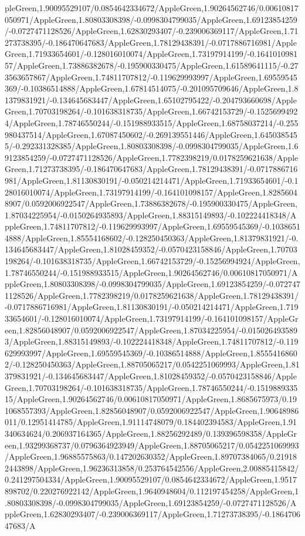 {\begin{tikzternal}
{pleGreen,1.90095529107/0.0854642334672/AppleGreen,1.90264562746/0.00610817050971/AppleGreen,1.80803308398/-0.0998304799035/AppleGreen,1.69123854259/-0.0727471128526/AppleGreen,1.62830293407/-0.239006369117/AppleGreen,1.71273738395/-0.186470647683/AppleGreen,1.78129438391/-0.0717886716981/AppleGreen,1.71933654601/-0.128016010074/AppleGreen,1.73197914199/-0.164101098157/AppleGreen,1.73886382678/-0.195900330475/AppleGreen,1.61589641115/-0.273563657867/AppleGreen,1.74811707812/-0.119629993997/AppleGreen,1.69559545369/-0.10386514888/AppleGreen,1.67814514075/-0.201095709646/AppleGreen,1.81379831921/-0.134645683447/AppleGreen,1.65102795422/-0.204793660698/AppleGreen,1.70703198264/-0.101638318735/AppleGreen,1.66742153729/-0.15256994924/AppleGreen,1.78746550244/-0.151988933515/AppleGreen,1.68758037214/-0.255980437514/AppleGreen,1.67087450602/-0.269139551446/AppleGreen,1.6450385455/-0.292331328385/AppleGreen,1.80803308398/-0.0998304799035/AppleGreen,1.69123854259/-0.0727471128526/AppleGreen,1.7782398219/0.0178259621638/AppleGreen,1.71273738395/-0.186470647683/AppleGreen,1.78129438391/-0.0717886716981/AppleGreen,1.81130830191/-0.050214214471/AppleGreen,1.71933654601/-0.128016010074/AppleGreen,1.73197914199/-0.164101098157/AppleGreen,1.82856048907/0.0592006922547/AppleGreen,1.73886382678/-0.195900330475/AppleGreen,1.87034225954/-0.0150264935893/AppleGreen,1.88315149893/-0.102224418348/AppleGreen,1.74811707812/-0.119629993997/AppleGreen,1.69559545369/-0.10386514888/AppleGreen,1.85554168602/-0.128250450363/AppleGreen,1.81379831921/-0.134645683447/AppleGreen,1.81028459352/-0.0570423158846/AppleGreen,1.70703198264/-0.101638318735/AppleGreen,1.66742153729/-0.15256994924/AppleGreen,1.78746550244/-0.151988933515/AppleGreen,1.90264562746/0.00610817050971/AppleGreen,1.80803308398/-0.0998304799035/AppleGreen,1.69123854259/-0.0727471128526/AppleGreen,1.7782398219/0.0178259621638/AppleGreen,1.78129438391/-0.0717886716981/AppleGreen,1.81130830191/-0.050214214471/AppleGreen,1.71933654601/-0.128016010074/AppleGreen,1.73197914199/-0.164101098157/AppleGreen,1.82856048907/0.0592006922547/AppleGreen,1.87034225954/-0.0150264935893/AppleGreen,1.88315149893/-0.102224418348/AppleGreen,1.74811707812/-0.119629993997/AppleGreen,1.69559545369/-0.10386514888/AppleGreen,1.85554168602/-0.128250450363/AppleGreen,1.88705065217/0.0542251069993/AppleGreen,1.81379831921/-0.134645683447/AppleGreen,1.81028459352/-0.0570423158846/AppleGreen,1.70703198264/-0.101638318735/AppleGreen,1.78746550244/-0.151988933515/AppleGreen,1.90264562746/0.00610817050971/AppleGreen,1.8685675973/0.191068557393/AppleGreen,1.82856048907/0.0592006922547/AppleGreen,1.90648986011/0.12951414785/AppleGreen,1.91114748079/0.184402394583/AppleGreen,1.91340634624/0.206937164365/AppleGreen,1.88256292489/0.139396598358/AppleGreen,1.93299368737/0.0796364923949/AppleGreen,1.88705065217/0.0542251069993/AppleGreen,1.96885575863/0.147202630352/AppleGreen,1.89707384065/0.219182443898/AppleGreen,1.96236313858/0.253764542556/AppleGreen,2.00885415842/0.241297504334/AppleGreen,1.90095529107/0.0854642334672/AppleGreen,1.9517898702/0.220276922142/AppleGreen,1.9640948604/0.112197454258/AppleGreen,1.80803308398/-0.0998304799035/AppleGreen,1.69123854259/-0.0727471128526/AppleGreen,1.62830293407/-0.239006369117/AppleGreen,1.71273738395/-0.186470647683/A}
\end{tikzternal}}
